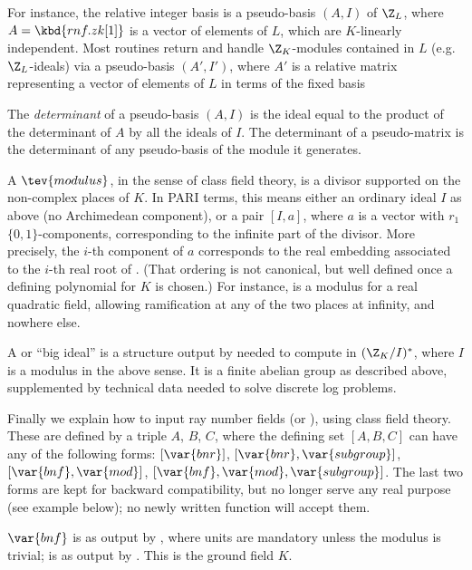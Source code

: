 \item For instance, the relative integer basis  is a pseudo-basis
$(A,I)$ of $\Z_L$, where $A = \kbd{rnf.zk[1]}$ is a vector of elements of $L$,
which are $K$-linearly independent. Most  routines return and handle
$\Z_K$-modules contained in $L$ (e.g.~$\Z_L$-ideals) via a pseudo-basis
$(A',I')$, where $A'$ is a relative matrix representing a vector of elements of
$L$ in terms of the fixed basis 

\item The \emph{determinant} of a pseudo-basis $(A,I)$ is the ideal
equal to the product of the determinant of $A$ by all the ideals of $I$. The
determinant of a pseudo-matrix is the determinant of any pseudo-basis of the
module it generates.

\label{se:CFT}

A $\tev{modulus}$, in the sense of class field theory, is a divisor supported
on the non-complex places of $K$. In PARI terms, this means either an
ordinary ideal $I$ as above (no Archimedean component), or a pair $[I,a]$,
where $a$ is a vector with $r_1$ $\{0,1\}$-components, corresponding to the
infinite part of the divisor. More precisely, the $i$-th component of $a$
corresponds to the real embedding associated to the $i$-th real root of
. (That ordering is not canonical, but well defined once a
defining polynomial for $K$ is chosen.) For instance, \kbd{[1, [1,1]]} is a
modulus for a real quadratic field, allowing ramification at any of the two
places at infinity, and nowhere else.

A  or ``big ideal'' is a structure output by 
needed to compute in $(\Z_K/I)^*$, where $I$ is a modulus in the above sense.
It is a finite abelian group as described above, supplemented by
technical data needed to solve discrete log problems.

Finally we explain how to input ray number fields (or ), using class
field theory. These are defined by a triple $A$, $B$, $C$, where the
defining set $[A,B,C]$ can have any of the following forms: $[\var{bnr}]$,
$[\var{bnr},\var{subgroup}]$, $[\var{bnf},\var{mod}]$,
$[\var{bnf},\var{mod},\var{subgroup}]$. The last two forms are kept for
backward compatibility, but no longer serve any real purpose (see example
below); no newly written function will accept them.

\item $\var{bnf}$ is as output by , where units are mandatory
unless the modulus is trivial;  is as output by . This
is the ground field $K$.

